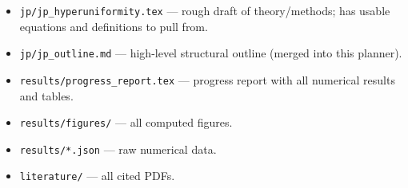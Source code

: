 \documentclass[11pt]{article}
\begin{document}
\begin{itemize}[leftmargin=1.5em]
  \item \texttt{jp/jp\_hyperuniformity.tex} --- rough draft of theory/methods;
        has usable equations and definitions to pull from.
  \item \texttt{jp/jp\_outline.md} --- high-level structural outline
        (merged into this planner).
  \item \texttt{results/progress\_report.tex} --- progress report
        with all numerical results and tables.
  \item \texttt{results/figures/} --- all computed figures.
  \item \texttt{results/*.json} --- raw numerical data.
  \item \texttt{literature/} --- all cited PDFs.
\end{itemize}
\end{document}
